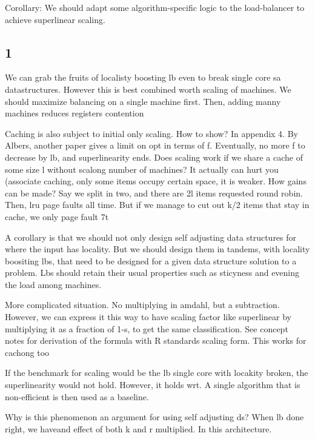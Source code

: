 Corollary: We should adapt some algorithm-specific logic to the load-balancer to achieve superlinear scaling.



\subsection{1}


We can grab the fruits of localisty boosting lb even to break single core sa datastructures. However  this is best combined worth scaling of machines. We should maximize balancing on a single machine first. Then, adding manny machines reduces registers contention




Caching is also subject to initial only scaling. How to show? In appendix 4. By Albers, another paper gives a limit on opt in terms of f. Eventually, no more f to decrease by lb, and superlinearity ends. Does scaling work if we share a cache of some size l without scalong number of machines? It actually can hurt you (associate caching, only some items occupy certain space, it is weaker. How gains can be made? Say we split in two, and there are 2l items requested round robin. Then, lru page faults all time. But if we manage to cut out k/2 items that stay in cache, we only page fault 7t%


A corollary is that we should not only design self adjusting data structures for where the input has locality. But we should design them in tandems, with locality boositing lbs, that need to be designed for a given data structure solution to a problem. Lbs should retain their usual properties such as sticyness and evening the load among machines.

More complicated situation. No multiplying in amdahl, but a subtraction. However, we can express it this way to have scaling factor like superlinear by multiplying it as a fraction of 1-s, to get the same classification. See concept notes for derivation of the formula with R standards scaling form. This works for cachong too


If the benchmark for scaling would be the lb single core with locakity broken, the superlinearity would not hold. However, it holds wrt. A single algorithm that is non-efficient is then used as a baseline.




Why is this phenomenon an argument for using self adjusting ds? When lb done right, we haveand effect of both k and r multiplied. In this architecture.

